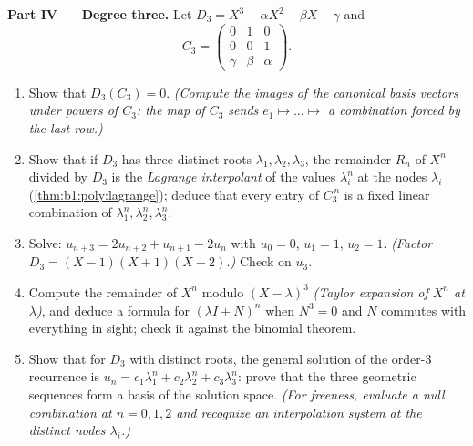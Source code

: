 \begin{problem}
\medskip
\noindent\textbf{Part IV --- Degree three.} Let $D_3 = X^3 -
\alpha X^2 - \beta X - \gamma$ and
\[
C_3 = \begin{pmatrix} 0 & 1 & 0\\ 0 & 0 & 1\\ \gamma & \beta &
\alpha \end{pmatrix}.
\]
\begin{enumerate}[resume]
  \item Show that $D_3(C_3) = 0$. \emph{(Compute the images of
        the canonical basis vectors under powers of $C_3$: the
        map of $C_3$ sends $e_1 \mapsto \dots \mapsto$ a
        combination forced by the last row.)}
  \item Show that if $D_3$ has three distinct roots $\lambda_1,
        \lambda_2, \lambda_3$, the remainder $R_n$ of $X^n$
        divided by $D_3$ is the \emph{Lagrange interpolant} of
        the values $\lambda_i^n$ at the nodes $\lambda_i$
        (\cref{thm:b1:poly:lagrange}); deduce that every entry
        of $C_3^{\,n}$ is a fixed linear combination of
        $\lambda_1^n, \lambda_2^n, \lambda_3^n$.
  \item Solve: $u_{n+3} = 2u_{n+2} + u_{n+1} - 2u_n$ with $u_0 =
        0$, $u_1 = 1$, $u_2 = 1$. \emph{(Factor $D_3 = (X - 1)(X
        + 1)(X - 2)$.)} Check on $u_3$.
  \item Compute the remainder of $X^n$ modulo $(X -
        \lambda)^3$ \emph{(Taylor expansion of $X^n$ at
        $\lambda$)}, and deduce a formula for $(\lambda I +
        N)^n$ when $N^3 = 0$ and $N$ commutes with everything in
        sight; check it against the binomial theorem.
  \item Show that for $D_3$ with distinct roots, the general
        solution of the order-$3$ recurrence is $u_n = c_1
        \lambda_1^n + c_2\lambda_2^n + c_3\lambda_3^n$: prove
        that the three geometric sequences form a basis of the
        solution space. \emph{(For freeness, evaluate a null
        combination at $n = 0, 1, 2$ and recognize an
        interpolation system at the distinct nodes
        $\lambda_i$.)}
\end{enumerate}


\end{problem}
